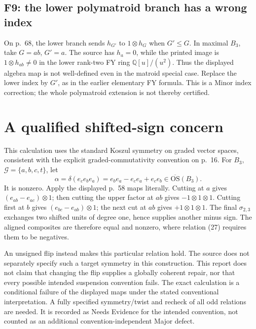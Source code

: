 \documentclass[10pt]{article}
\begin{document}
\subsection*{F9: the lower polymatroid branch has a wrong index}
On p. 68, the lower branch sends \(h_{G'}\) to \(1\otimes h_G\) when \(G'\leq G\). In maximal \(B_3\), take \(G=ab\), \(G'=a\). The source has \(h_a=0\), while the printed image is \(1\otimes h_{ab}\ne0\) in the lower rank-two FY ring \(\mathbb Q[u]/(u^2)\). Thus the displayed algebra map is not well-defined even in the matroid special case. Replace the lower index by \(G'\), as in the earlier elementary FY formula. This is a Minor index correction; the whole polymatroid extension is not thereby certified.\par
\section*{A qualified shifted-sign concern}
This calculation uses the standard Koszul symmetry on graded vector spaces, consistent with the explicit graded-commutativity convention on p. 16. For \(B_3\), \(\mathcal G=\{a,b,c,t\}\), let \[\alpha=\delta(e_c e_b e_a)
       =e_b e_a-e_c e_a+e_c e_b\in\overline{\mathrm{OS}}(B_3).\] It is nonzero. Apply the displayed p. 58 maps literally. Cutting at \(a\) gives \((e_{ab}-e_{ac})\otimes1\); then cutting the upper factor at \(ab\) gives \(-1\otimes1\otimes1\). Cutting first at \(b\) gives \((e_{bc}-e_{ab})\otimes1\); the next cut at \(ab\) gives \(+1\otimes1\otimes1\). The final \(\sigma_{2,3}\) exchanges two shifted units of degree one, hence supplies another minus sign. The aligned composites are therefore equal and nonzero, where relation (27) requires them to be negatives.\par
An unsigned flip instead makes this particular relation hold. The source does not separately specify such a target symmetry in this construction. This report does not claim that changing the flip supplies a globally coherent repair, nor that every possible intended suspension convention fails. The exact calculation is a conditional failure of the displayed maps under the stated conventional interpretation. A fully specified symmetry/twist and recheck of all odd relations are needed. It is recorded as Needs Evidence for the intended convention, not counted as an additional convention-independent Major defect.\par
\end{document}
